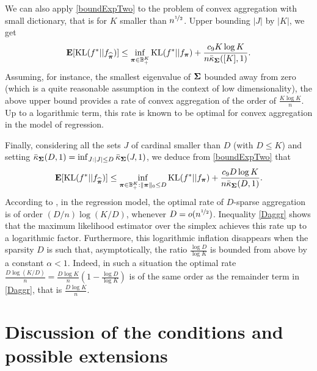 We can also apply  \eqref{boundExpTwo} to the problem of convex aggregation with
small dictionary, that is for $K$ smaller than  $n^{\nicefrac12}$. Upper bounding $|J|$ by $|K|$,
we get
\begin{equation}
\mathbf E[{\rm KL}(f^*|| f_{\widehat{\boldsymbol \pi}})] \leq \inf_{\boldsymbol \pi \in {\mathbb B}_+^K}
{\rm KL}(f^*|| f_{\boldsymbol \pi}) +\frac{c_9 K \log K}{n\bar\kappa_{\boldsymbol\Sigma}([K],1)}.
\label{Caggr}
\end{equation}
Assuming, for instance, the smallest eigenvalue of $\boldsymbol\Sigma$ bounded away from zero (which
is a quite reasonable assumption in the context of low dimensionality), the above upper
bound provides a rate of convex aggregation of the order of $\frac{K\log K}{n}$. Up to a
logarithmic term, this rate is known to be optimal for convex aggregation in the model of
regression.

Finally, considering all the sets $J$ of cardinal smaller than $D$ (with $D\le K$) and
setting $\bar\kappa_{\boldsymbol\Sigma}(D,1) = \inf_{J:|J|\le D} \bar\kappa_{\boldsymbol\Sigma}(J,1)$, we
deduce from \eqref{boundExpTwo} that
\begin{equation}
\mathbf E[{\rm KL}(f^*|| f_{\widehat{\boldsymbol \pi}})] \leq \inf_{\boldsymbol \pi\in {\mathbb B}_+^K : \|\boldsymbol \pi\|_0\le D}
{\rm KL}(f^*|| f_{\boldsymbol \pi}) + \frac{c_9 D\log K}{n\bar\kappa_{\boldsymbol\Sigma}(D,1)}.\label{Daggr}
\end{equation}
According to \citep[Theorem 5.3]{RT11}, in the regression model, the optimal
rate of $D$-sparse aggregation is of order $(D/n)\log(K/D)$, whenever $D=o(n^{\nicefrac12})$.
Inequality \eqref{Daggr} shows that the maximum likelihood estimator over the simplex
achieves this rate up to a logarithmic factor. Furthermore, this logarithmic inflation
disappears when the sparsity $D$ is such that, asymptotically, the ratio $\frac{\log D}{\log K}$
is bounded from above by a constant $\alpha<1$. Indeed, in such a situation the optimal
rate $\frac{D\log(K/D)}{n} = \frac{D\log K}{n}(1-\frac{\log D}{\log K})$ is of the same
order as the remainder term in \eqref{Daggr}, that is $\frac{D\log K}{n}$.


\section{Discussion of the conditions and possible extensions} %
\label{sec:discussion_of_the_results}

